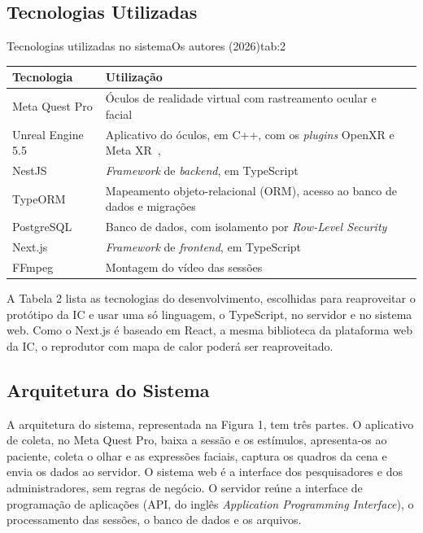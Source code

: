 \documentclass[conference,a4paper,10pt]{IEEEtran}
\begin{document}
\subsection{Tecnologias Utilizadas}

\begin{tabela}[!htb]{Tecnologias utilizadas no sistema}{Os autores (2026)}{tab:2}
  \footnotesize
  \begin{tabularx}{\columnwidth}{l|Y}
    \hline
    \textbf{Tecnologia} & \textbf{Utilização} \\
    \hline
    Meta Quest Pro & Óculos de realidade virtual com rastreamento ocular e facial~\cite{META-MOVE} \\
    Unreal Engine 5.5 & Aplicativo do óculos, em C++, com os \textit{plugins} OpenXR e Meta XR~\cite{UNREAL}, \cite{META-UNREAL} \\
    NestJS & \textit{Framework} de \textit{backend}, em TypeScript~\cite{NESTJS} \\
    TypeORM & Mapeamento objeto-relacional (ORM), acesso ao banco de dados e migrações~\cite{TYPEORM} \\
    PostgreSQL & Banco de dados, com isolamento por \textit{Row-Level Security}~\cite{POSTGRES} \\
    Next.js & \textit{Framework} de \textit{frontend}, em TypeScript~\cite{NEXTJS} \\
    FFmpeg & Montagem do vídeo das sessões~\cite{FFMPEG} \\
    \hline
  \end{tabularx}
\end{tabela}

A Tabela 2 lista as tecnologias do desenvolvimento, escolhidas para reaproveitar o protótipo da IC e usar uma só linguagem, o TypeScript, no servidor e no sistema web. Como o Next.js é baseado em React, a mesma biblioteca da plataforma web da IC, o reprodutor com mapa de calor poderá ser reaproveitado.

\subsection{Arquitetura do Sistema}

A arquitetura do sistema, representada na Figura 1, tem três partes. O aplicativo de coleta, no Meta Quest Pro, baixa a sessão e os estímulos, apresenta-os ao paciente, coleta o olhar e as expressões faciais, captura os quadros da cena e envia os dados ao servidor. O sistema web é a interface dos pesquisadores e dos administradores, sem regras de negócio. O servidor reúne a interface de programação de aplicações (API, do inglês \textit{Application Programming Interface}), o processamento das sessões, o banco de dados e os arquivos.
\end{document}

